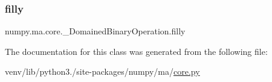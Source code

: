 \mbox{\label{classnumpy_1_1ma_1_1core_1_1__DomainedBinaryOperation_aee133906481810f094e3080e03db5e50}} 
\subsubsection{\texorpdfstring{filly}{filly}}
{\footnotesize\ttfamily numpy.\+ma.\+core.\+\_\+\+Domained\+Binary\+Operation.\+filly}



The documentation for this class was generated from the following file\+:\begin{DoxyCompactItemize}
\item 
venv/lib/python3./site-\/packages/numpy/ma/\hyperlink{numpy_2ma_2core_8py}{core.\+py}\end{DoxyCompactItemize}
